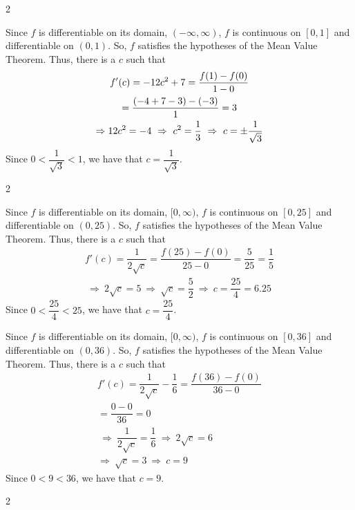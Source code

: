 \documentclass{book}
\begin{document}
\begin{appendices}
\begin{enumerate}[!HW!]
\begin{multicols}{2}
\item \mbox{}\vspace{-25pt}

\begin{pf}
Since $f$ is differentiable on its domain, $(-\infty, \infty)$, $f$ is continuous on $[0,1]$ and differentiable on $(0,1)$. So, $f$ satisfies the hypotheses of the Mean Value Theorem. Thus, there is a $c$ such that 
\begin{multline*}
f'(c) = -12c^2+7 = \dfrac{f(1) - f(0)}{1-0}\\=\dfrac{(-4+7-3)-(-3)}{1} = 3\\ \Rightarrow\-12c^2 = -4
\ \Rightarrow\ c^2 = \dfrac{1}{3}\ \Rightarrow\ c= \pm \dfrac{1}{\sqrt{3}}
\end{multline*} Since $0 < \dfrac{1}{\sqrt{3}} < 1$, we have that $c= \dfrac{1}{\sqrt{3}}$.
\end{pf}
\end{multicols}
\begin{multicols}{2}
\itemspade \mbox{}\vspace{-25pt}

\begin{pf}
Since $f$ is differentiable on its domain, $[0, \infty)$, $f$ is continuous on $[0,25]$ and differentiable on $(0,25)$. So, $f$ satisfies the hypotheses of the Mean Value Theorem. Thus, there is a $c$ such that 
\begin{multline*}
f'(c)=\dfrac{1}{2\sqrt{c}} = \dfrac{f(25) - f(0)}{25-0}=\dfrac{5}{25} = \dfrac{1}{5}\\
\ \Rightarrow\ 2\sqrt{c} = 5\ \Rightarrow\ \sqrt{c}= \dfrac{5}{2}\ \Rightarrow\ c= \dfrac{25}{4} = 6.25
\end{multline*} Since $0 < \dfrac{25}{4} < 25$, we have that $c= \dfrac{25}{4}$.
\end{pf}\columnbreak

\itemspade \mbox{}\vspace{-25pt}

\begin{pf}
Since $f$ is differentiable on its domain, $[0, \infty)$, $f$ is continuous on $[0,36]$ and differentiable on $(0,36)$. So, $f$ satisfies the hypotheses of the Mean Value Theorem. Thus, there is a $c$ such that 
\begin{multline*}
f'(c) = \dfrac{1}{2\sqrt{c}}-\dfrac{1}{6} = \dfrac{f(36) - f(0)}{36-0}\\=\dfrac{0-0}{36} = 0\\
\ \Rightarrow\ \dfrac{1}{2\sqrt{c}} = \dfrac{1}{6} \ \Rightarrow\ 2\sqrt{c} = 6 \\ \Rightarrow\ \sqrt{c}= 3 \ \Rightarrow\ c= 9
\end{multline*} Since $0 < 9 < 36$, we have that $c= 9$.
\end{pf}
\end{multicols}
\begin{multicols}{2}
\itemspade \mbox{}\vspace{-25pt}


\end{multicols}
\end{enumerate}
\end{appendices}
\end{document}
